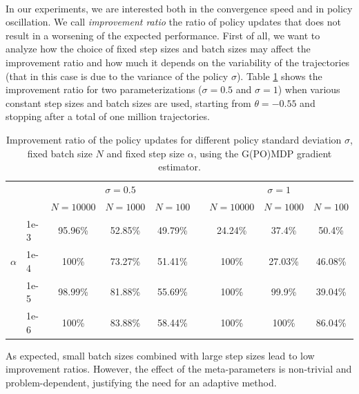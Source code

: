 \paragraph{}
In our experiments, we are interested both in the convergence speed and in policy oscillation. We call \textit{improvement ratio} the ratio of policy updates that does not result in a worsening of the expected performance. First of all, we want to analyze how the choice of fixed step sizes and batch sizes may affect the improvement ratio and how much it depends on the variability of the trajectories (that in this case is due to the variance of the policy $\sigma$).
Table \ref{tab:1} shows the improvement ratio for two parameterizations ($\sigma=0.5$ and $\sigma=1$) when various constant step sizes and batch sizes are used, starting from $\theta=-0.55$ and stopping after a total of one million trajectories. 

\begin{table}[H]
\caption[Improvement ratio of the policy updates for different parametrizations of the LQG task.]{Improvement ratio of the policy updates for different policy standard deviation $\sigma$, fixed batch size $N$ and fixed step size $\alpha$, using the G(PO)MDP gradient estimator.}
\label{tab:1}
\centering
\begin{adjustbox}{width=1.0\linewidth,center}
\begin{tabular}{@{}llccccccc@{}} 
\toprule
\phantom{abc} & \phantom{abc} & \multicolumn{3}{c}{$\sigma=0.5$} & \phantom{abc} & \multicolumn{3}{c}{$\sigma=1$} \\
\cmidrule{3-5} \cmidrule{7-9}
\phantom{abc} & \phantom{abc} & $N=10000$ & $N=1000$ & $N=100$ & \phantom{abc} & $N=10000$ & $N=1000$ & $N=100$
\\\cmidrule{3-9}
\phantom{abc} & 1e-3 & 95.96\% & 52.85\% & 49.79\% & \phantom{abc} & 24.24\% & 37.4\% & 50.4\% \\ 
 $\alpha$	  & 1e-4 & 100\% & 73.27\% & 51.41\% & \phantom{abc} & 100\% & 27.03\% & 46.08\% \\
\phantom{abc} & 1e-5 & 98.99\% & 81.88\% & 55.69\% & \phantom{abc} & 100\% & 99.9\% & 39.04\%\\
\phantom{abc} & 1e-6 & 100\% & 83.88\% & 58.44\% & \phantom{abc} & 100\% & 100\% & 86.04\% \\
\bottomrule
\end{tabular}
\end{adjustbox}
\end{table}

As expected, small batch sizes combined with large step sizes lead to low improvement ratios. However, the effect of the meta-parameters is non-trivial and problem-dependent, justifying the need for an adaptive method.  
